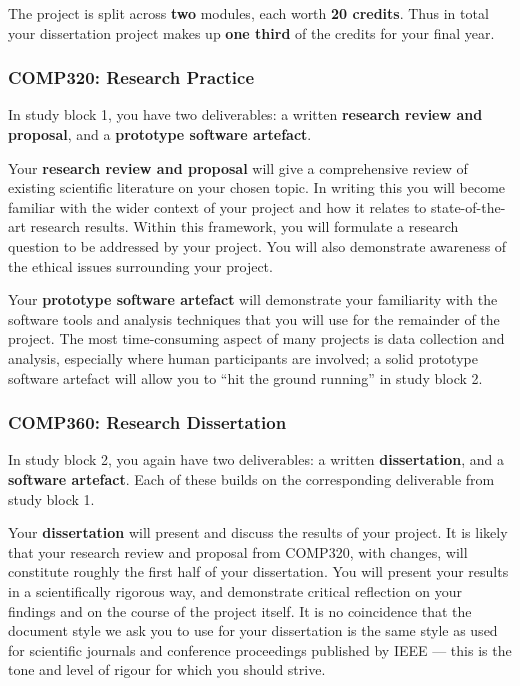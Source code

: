 The project is split across \textbf{two} modules, each worth \textbf{20 credits}.
Thus in total your dissertation project makes up \textbf{one third} of the credits for your final year.

\subsubsection*{COMP320: Research Practice}

In study block 1, you have two deliverables: a written \textbf{research review and proposal},
and a \textbf{prototype software artefact}.

Your \textbf{research review and proposal} will give a comprehensive review of existing scientific literature
on your chosen topic. In writing this you will become familiar with the wider context of your project
and how it relates to state-of-the-art research results.
Within this framework, you will formulate a research question to be addressed by your project.
You will also demonstrate awareness of the ethical issues surrounding your project.

Your \textbf{prototype software artefact} will demonstrate your familiarity with the software tools and analysis techniques
that you will use for the remainder of the project.
The most time-consuming aspect of many projects is data collection and analysis,
especially where human participants are involved;
a solid prototype software artefact will allow you to ``hit the ground running'' in study block 2.

\subsubsection*{COMP360: Research Dissertation}

In study block 2, you again have two deliverables: a written \textbf{dissertation},
and a \textbf{software artefact}. Each of these builds on the corresponding deliverable from study block 1.

Your \textbf{dissertation} will present and discuss the results of your project.
It is likely that your research review and proposal from COMP320, with changes, will constitute roughly the first half
of your dissertation.
You will present your results in a scientifically rigorous way, and demonstrate critical reflection
on your findings and on the course of the project itself.
It is no coincidence that the document style we ask you to use for your dissertation is the same style
as used for scientific journals and conference proceedings published by IEEE ---
this is the tone and level of rigour for which you should strive.

